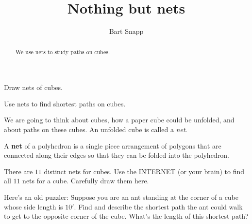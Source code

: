 \documentclass[noauthor,nooutcomes,hints,handout]{ximera}
\title{Nothing but nets}
\author{Bart Snapp}
\begin{document}
\begin{abstract}
  We use nets to study paths on cubes.
\end{abstract}
\maketitle

\begin{listOutcomes}
\item Draw nets of cubes.
\item Use nets to find shortest paths on cubes.
\end{listOutcomes}



We are going to think about cubes, how a paper cube could be unfolded, and about paths on these cubes. An unfolded cube is called a \textit{net}.


\begin{definition}
  A \textbf{net} of a polyhedron is a
  single piece arrangement of polygons that are connected along their
  edges so that they can be folded into the polyhedron.
\end{definition}


\mynewpage


\begin{question}
  There are $11$ distinct nets for cubes. Use the INTERNET (or your
  brain) to find all $11$ nets for a cube. Carefully draw them here.
  
\end{question}
\mynewpage

\begin{question}
  Here's an old puzzler: Suppose you are an ant standing at the corner
  of a cube whose side length is $10'$. Find and describe the shortest
  path the ant could walk to get to the opposite corner of the cube. What's the
  length of this shortest path?
\end{question}
\mynewpage
\end{document}
